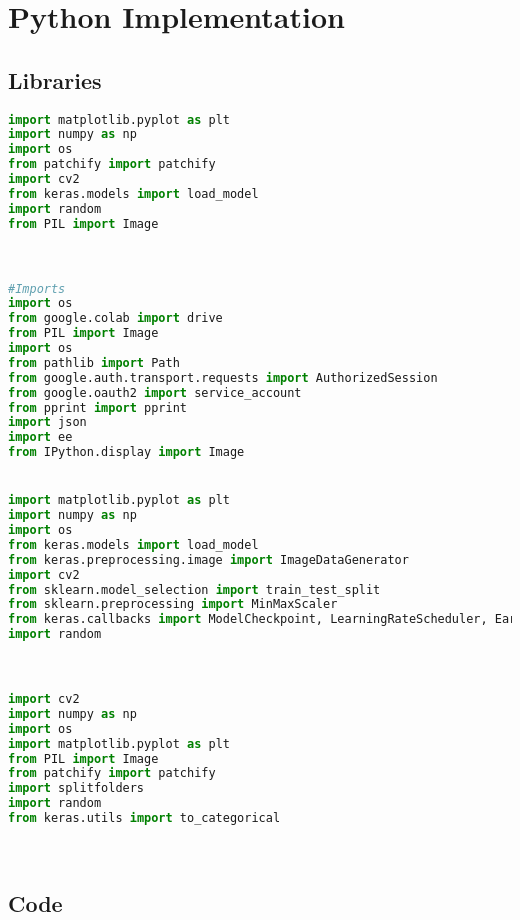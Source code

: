 \chapter{Python Implementation}
\section{Libraries}
\begin{lstlisting}[language=Python]
import matplotlib.pyplot as plt
import numpy as np 
import os
from patchify import patchify
import cv2
from keras.models import load_model
import random
from PIL import Image



#Imports
import os
from google.colab import drive
from PIL import Image
import os
from pathlib import Path
from google.auth.transport.requests import AuthorizedSession
from google.oauth2 import service_account
from pprint import pprint
import json
import ee
from IPython.display import Image


import matplotlib.pyplot as plt
import numpy as np 
import os
from keras.models import load_model
from keras.preprocessing.image import ImageDataGenerator
import cv2
from sklearn.model_selection import train_test_split
from sklearn.preprocessing import MinMaxScaler
from keras.callbacks import ModelCheckpoint, LearningRateScheduler, EarlyStopping
import random



import cv2
import numpy as np
import os
import matplotlib.pyplot as plt
from PIL import Image
from patchify import patchify
import splitfolders
import random
from keras.utils import to_categorical




\end{lstlisting}


\section{Code} 
